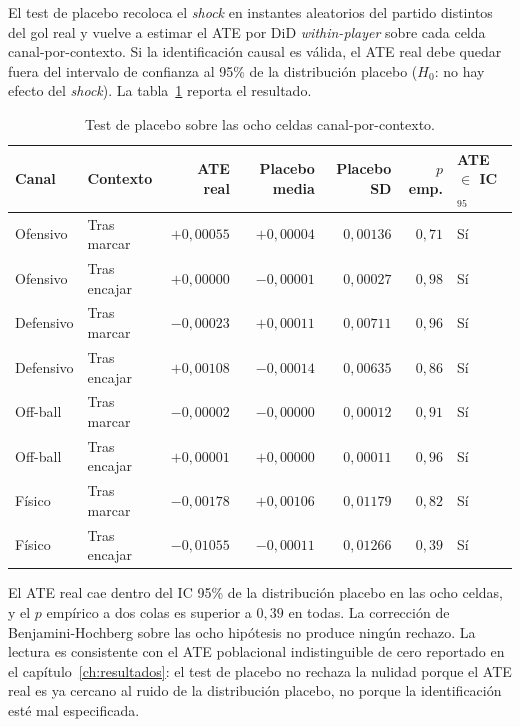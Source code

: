 El test de placebo recoloca el \textit{shock} en instantes aleatorios
del partido distintos del gol real y vuelve a estimar el ATE por DiD
\textit{within-player} sobre cada celda canal-por-contexto. Si la
identificación causal es válida, el ATE real debe quedar fuera del
intervalo de confianza al 95\% de la distribución placebo
($H_0$: no hay efecto del \textit{shock}). La
tabla~\ref{tab:placebo} reporta el resultado.

\begin{table}[h]
  \centering
  \small
  \caption{Test de placebo sobre las ocho celdas
    canal-por-contexto.}
  \label{tab:placebo}
  \begin{tabular}{llrrrrl}
    \toprule
    Canal & Contexto & ATE real & Placebo media & Placebo SD & $p$ emp. & ATE $\in$ IC$_{95}$ \\
    \midrule
    Ofensivo  & Tras marcar  & $+0{,}00055$ & $+0{,}00004$ & $0{,}00136$ & $0{,}71$ & Sí \\
    Ofensivo  & Tras encajar & $+0{,}00000$ & $-0{,}00001$ & $0{,}00027$ & $0{,}98$ & Sí \\
    Defensivo & Tras marcar  & $-0{,}00023$ & $+0{,}00011$ & $0{,}00711$ & $0{,}96$ & Sí \\
    Defensivo & Tras encajar & $+0{,}00108$ & $-0{,}00014$ & $0{,}00635$ & $0{,}86$ & Sí \\
    Off-ball  & Tras marcar  & $-0{,}00002$ & $-0{,}00000$ & $0{,}00012$ & $0{,}91$ & Sí \\
    Off-ball  & Tras encajar & $+0{,}00001$ & $+0{,}00000$ & $0{,}00011$ & $0{,}96$ & Sí \\
    Físico    & Tras marcar  & $-0{,}00178$ & $+0{,}00106$ & $0{,}01179$ & $0{,}82$ & Sí \\
    Físico    & Tras encajar & $-0{,}01055$ & $-0{,}00011$ & $0{,}01266$ & $0{,}39$ & Sí \\
    \bottomrule
  \end{tabular}
\end{table}

El ATE real cae dentro del IC 95\% de la distribución placebo en las
ocho celdas, y el $p$ empírico a dos colas es superior a $0{,}39$ en
todas. La corrección de Benjamini-Hochberg sobre las ocho hipótesis
no produce ningún rechazo. La lectura es consistente con el ATE
poblacional indistinguible de cero reportado en el
capítulo~\ref{ch:resultados}: el test de placebo no rechaza la
nulidad porque el ATE real es ya cercano al ruido de la distribución
placebo, no porque la identificación esté mal especificada.

